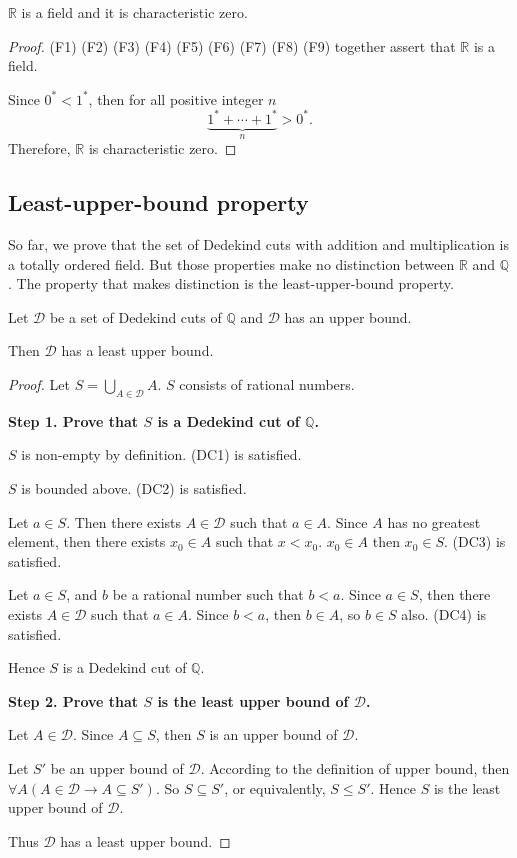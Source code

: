 \begin{theorem}
    $\mathbb{R}$ is a field and it is characteristic zero.
\end{theorem}

\begin{proof}
    (F1) (F2) (F3) (F4) (F5) (F6) (F7) (F8) (F9) together assert that $\mathbb{R}$ is a field.

    Since ${0}^{*} < {1}^{*}$, then for all positive integer $n$
    \[
        \underbrace{{1}^{*} + \cdots + {1}^{*}}_{n} > {0}^{*}.
    \]
    Therefore, $\mathbb{R}$ is characteristic zero.
\end{proof}

\subsection{Least-upper-bound property}

So far, we prove that the set of Dedekind cuts with addition and multiplication is a totally ordered field. But those properties make no distinction between $\mathbb{R}$ and $\mathbb{Q}$. The property that makes distinction is the least-upper-bound property.

\begin{theorem}
    Let $\mathcal{D}$ be a set of Dedekind cuts of $\mathbb{Q}$ and $\mathcal{D}$ has an upper bound.

    Then $\mathcal{D}$ has a least upper bound.
\end{theorem}

\begin{proof}
    Let $S = \bigcup\limits_{A\in\mathcal{D}} A$. $S$ consists of rational numbers.

    \textbf{Step 1. Prove that $S$ is a Dedekind cut of $\mathbb{Q}$.}

    $S$ is non-empty by definition. (DC1) is satisfied.

    $S$ is bounded above. (DC2) is satisfied.

    Let $a\in S$. Then there exists $A\in\mathcal{D}$ such that $a\in A$. Since $A$ has no greatest element, then there exists $x_{0}\in A$ such that $x < x_{0}$. $x_{0}\in A$ then $x_{0}\in S$. (DC3) is satisfied.

    Let $a\in S$, and $b$ be a rational number such that $b < a$. Since $a\in S$, then there exists $A\in\mathcal{D}$ such that $a\in A$. Since $b < a$, then $b\in A$, so $b\in S$ also. (DC4) is satisfied.

    Hence $S$ is a Dedekind cut of $\mathbb{Q}$.
    \bigskip

    \textbf{Step 2. Prove that $S$ is the least upper bound of $\mathcal{D}$.}

    Let $A\in\mathcal{D}$. Since $A\subseteq S$, then $S$ is an upper bound of $\mathcal{D}$.

    Let $S'$ be an upper bound of $\mathcal{D}$. According to the definition of upper bound, then $\forall A (A\in\mathcal{D}\rightarrow A\subseteq S')$. So $S\subseteq S'$, or equivalently, $S\le S'$. Hence $S$ is the least upper bound of $\mathcal{D}$.

    Thus $\mathcal{D}$ has a least upper bound.
\end{proof}

